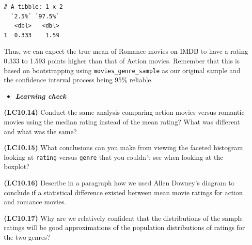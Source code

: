 \documentclass[12pt,]{krantz}
\makeatletter
\newenvironment{Shaded}{\begin{snugshade}}{\end{snugshade}}
\newcommand{\KeywordTok}[1]{\textcolor[rgb]{0.27,0.27,0.27}{\textbf{#1}}}
\newcommand{\DataTypeTok}[1]{\textcolor[rgb]{0.27,0.27,0.27}{#1}}
\newcommand{\DecValTok}[1]{\textcolor[rgb]{0.06,0.06,0.06}{#1}}
\newcommand{\StringTok}[1]{\textcolor[rgb]{0.5,0.5,0.5}{#1}}
\newcommand{\CommentTok}[1]{\textcolor[rgb]{0.37,0.37,0.37}{\textit{#1}}}
\newcommand{\OperatorTok}[1]{\textcolor[rgb]{0.43,0.43,0.43}{\textbf{#1}}}
\newcommand{\NormalTok}[1]{#1}
\newenvironment{kframe}{%
\medskip{}
\setlength{\fboxsep}{.8em}
 \def\at@end@of@kframe{}%
 \ifinner\ifhmode%
  \def\at@end@of@kframe{\end{minipage}}%
  \begin{minipage}{\columnwidth}%
 \fi\fi%
 \def\FrameCommand##1{\hskip\@totalleftmargin \hskip-\fboxsep
 \colorbox{shadecolor}{##1}\hskip-\fboxsep
     \hskip-\linewidth \hskip-\@totalleftmargin \hskip\columnwidth}%
 \MakeFramed {\advance\hsize-\width
   \@totalleftmargin\z@ \linewidth\hsize
   \@setminipage}}%
 {\par\unskip\endMakeFramed%
 \at@end@of@kframe}
\renewenvironment{Shaded}{\begin{kframe}}{\end{kframe}}
\newenvironment{rmdblock}[1]
  {\begin{shaded*}
  \begin{itemize}
  \renewcommand{\labelitemi}{
    \raisebox{-.7\height}[0pt][0pt]{
    }
  }
  \item
  }
  {
  \end{itemize}
  \end{shaded*}
  }
\newenvironment{learncheck}
  {\begin{rmdblock}{warning}}
  {\end{rmdblock}}
\theoremstyle{definition}
\theoremstyle{definition}
\theoremstyle{definition}
\theoremstyle{remark}
\makeatother
\begin{document}
\begin{Shaded}
\end{Shaded}

\begin{verbatim}
# A tibble: 1 x 2
  `2.5%` `97.5%`
   <dbl>   <dbl>
1  0.333    1.59
\end{verbatim}

Thus, we can expect the true mean of Romance movies on IMDB to have a
rating 0.333 to 1.593 points higher than that of Action movies. Remember
that this is based on bootstrapping using \texttt{movies\_genre\_sample}
as our original sample and the confidence interval process being 95\%
reliable.

\begin{learncheck}
\textbf{\emph{Learning check}}
\end{learncheck}

\textbf{(LC10.14)} Conduct the same analysis comparing action movies
versus romantic movies using the median rating instead of the mean
rating? What was different and what was the same?

\textbf{(LC10.15)} What conclusions can you make from viewing the
faceted histogram looking at \texttt{rating} versus \texttt{genre} that
you couldn't see when looking at the boxplot?

\textbf{(LC10.16)} Describe in a paragraph how we used Allen Downey's
diagram to conclude if a statistical difference existed between mean
movie ratings for action and romance movies.

\textbf{(LC10.17)} Why are we relatively confident that the
distributions of the sample ratings will be good approximations of the
population distributions of ratings for the two genres?
\end{document}
